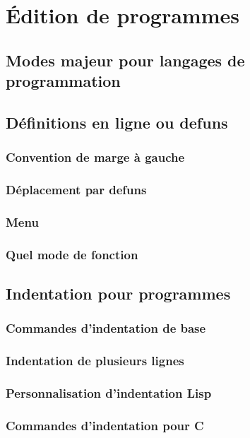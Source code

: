 \chapter{\'Edition de programmes}\label{chap23}
\section{Modes majeur pour langages de
  programmation}\label{chap23sec1} 
\section{Définitions en ligne ou defuns}\label{chap23sec2} 
\subsection{Convention de marge à gauche}\label{chap23sec2subsec1} 
\subsection{Déplacement par defuns}\label{chap23sec2subsec2}
\subsection{Menu}\label{chap23sec2subsec3}
\subsection{Quel mode de fonction}\label{chap23sec2subsec4}
\section{Indentation pour programmes}\label{chap23sec3}
\subsection{Commandes d'indentation de base}\label{chap23sec3subsec1}
\subsection{Indentation de plusieurs lignes}\label{chap23sec3subsec2}
\subsection{Personnalisation d'indentation Lisp}\label{chap23sec3subsec3}
\subsection{Commandes d'indentation pour C}\label{chap23sec3subsec4}

